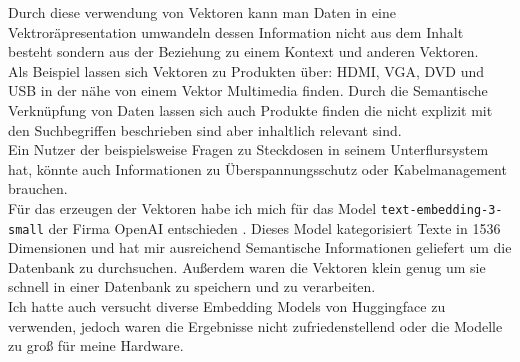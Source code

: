 Durch diese verwendung von Vektoren kann man Daten in eine Vektroräpresentation umwandeln dessen Information nicht aus dem Inhalt besteht sondern aus
der Beziehung zu einem Kontext und anderen Vektoren.\\
Als Beispiel lassen sich Vektoren zu Produkten über: HDMI, VGA, DVD und USB in der nähe von einem Vektor Multimedia finden.
Durch die Semantische Verknüpfung von Daten lassen sich auch Produkte finden die nicht explizit mit den Suchbegriffen beschrieben sind aber inhaltlich
relevant sind.\\
Ein Nutzer der beispielsweise Fragen zu Steckdosen in seinem Unterflursystem hat, könnte auch Informationen zu Überspannungsschutz oder Kabelmanagement brauchen.\\
Für das erzeugen der Vektoren habe ich mich für das Model \lstinline|text-embedding-3-small| der Firma OpenAI entschieden \cite{openai:Embeddings}.
Dieses Model kategorisiert Texte in 1536 Dimensionen und hat mir ausreichend Semantische Informationen geliefert um die Datenbank zu durchsuchen.
Außerdem waren die Vektoren klein genug um sie schnell in einer Datenbank zu speichern und zu verarbeiten.\\
Ich hatte auch versucht diverse Embedding Models von Huggingface zu verwenden, jedoch waren die Ergebnisse nicht zufriedenstellend oder die Modelle zu groß für meine Hardware.\\

